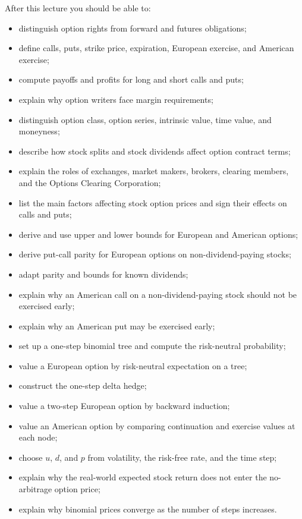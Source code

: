 After this lecture you should be able to:
\begin{itemize}
    \item distinguish option rights from forward and futures obligations;
    \item define calls, puts, strike price, expiration, European exercise, and
    American exercise;
    \item compute payoffs and profits for long and short calls and puts;
    \item explain why option writers face margin requirements;
    \item distinguish option class, option series, intrinsic value, time value,
    and moneyness;
    \item describe how stock splits and stock dividends affect option contract
    terms;
    \item explain the roles of exchanges, market makers, brokers, clearing
    members, and the Options Clearing Corporation;
    \item list the main factors affecting stock option prices and sign their
    effects on calls and puts;
    \item derive and use upper and lower bounds for European and American
    options;
    \item derive put-call parity for European options on non-dividend-paying
    stocks;
    \item adapt parity and bounds for known dividends;
    \item explain why an American call on a non-dividend-paying stock should not
    be exercised early;
    \item explain why an American put may be exercised early;
    \item set up a one-step binomial tree and compute the risk-neutral
    probability;
    \item value a European option by risk-neutral expectation on a tree;
    \item construct the one-step delta hedge;
    \item value a two-step European option by backward induction;
    \item value an American option by comparing continuation and exercise values
    at each node;
    \item choose $u$, $d$, and $p$ from volatility, the risk-free rate, and the
    time step;
    \item explain why the real-world expected stock return does not enter the
    no-arbitrage option price;
    \item explain why binomial prices converge as the number of steps increases.
\end{itemize}

